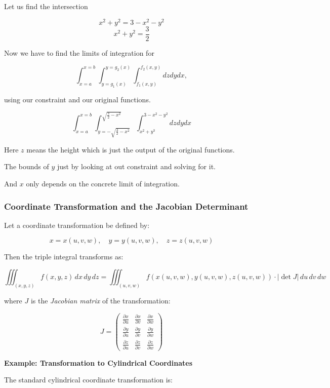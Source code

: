 Let us find the intersection

\[
    x^2 + y^2 = 3 -x^2 - y^2 
\]
\[
    x^2 + y^2 = \frac{3}{2}
\]

Now we have to find the limits of integration for 

\[
    \int_{x=a}^{x=b}\int_{y=g_1(x)}^{y=g_2(x)} \int_{f_1(x,y)}^{f_2(x,y)} dz dy dx,
\]

using our constraint and our original functions.

\[
    \int_{x=a}^{x=b}\int_{y=-\sqrt{\frac{3}{2} - x^2}}^{\sqrt{\frac{3}{2} -x^2}} \int_{x^2 + y^3}^{3-x^2-y^2} dz dy dx
\]

Here \(z\) means the height which is just the output
of the original functions.

The bounds of \(y\) just by looking at out constraint and solving for it.

And \(x\) only depends on the concrete limit of integration.


\subsubsection{Coordinate Transformation and the Jacobian Determinant}

Let a coordinate transformation be defined by:

\[
    x = x(u, v, w), \quad y = y(u, v, w), \quad z = z(u, v, w)
\]

Then the triple integral transforms as:

\[
    \iiint_{(x, y, z)} f(x, y, z)\, dx\, dy\, dz = \iiint_{(u, v, w)} f(x(u, v, w), y(u, v, w), z(u, v, w)) \cdot \left| \det J \right|\, du\, dv\, dw
\]

where \( J \) is the \emph{Jacobian matrix} of the transformation:

\[
    J = 
    \begin{pmatrix}
    \frac{\partial x}{\partial u} & \frac{\partial x}{\partial v} & \frac{\partial x}{\partial w} \\
    \frac{\partial y}{\partial u} & \frac{\partial y}{\partial v} & \frac{\partial y}{\partial w} \\
    \frac{\partial z}{\partial u} & \frac{\partial z}{\partial v} & \frac{\partial z}{\partial w}
    \end{pmatrix}
\]

\textbf{Example: Transformation to Cylindrical Coordinates}
\vspace{\baselineskip}

The standard cylindrical coordinate transformation is:

